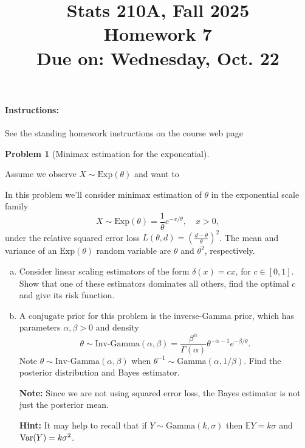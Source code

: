 \documentclass{article}
\newcommand{\EE}{\mathbb{E}}
\newcommand{\Var}{\textnormal{Var}}
\theoremstyle{definition}
\newtheorem{problem}{Problem}
\begin{document}
\title{Stats 210A, Fall 2025\\
  Homework 7 \\
  {\large {\bf Due on}: Wednesday, Oct. 22}}
\date{}

\maketitle

\paragraph{Instructions:} See the standing homework instructions on the course web page


\begin{problem}[Minimax estimation for the exponential]
\label{prob:minimax-exp}



Assume we observe $X\sim \text{Exp}(\theta)$ and want to 

In this problem we'll consider minimax estimation of $\theta$ in the exponential scale family
\[
X \sim \text{Exp}(\theta) = \frac{1}{\theta}e^{-x/\theta}, \quad x>0,
\]
under the relative squared error loss $L(\theta, d) = \left(\frac{d-\theta}{\theta}\right)^2$. The mean and variance of an $\text{Exp}(\theta)$ random variable are $\theta$ and $\theta^2$, respectively.

\begin{enumerate}[(a)]

\item Consider linear scaling estimators of the form $\delta(x) = cx$, for $c\in[0,1]$. Show that one of these estimators dominates all others, find the optimal $c$ and give its risk function.




\item A conjugate prior for this problem is the inverse-Gamma prior, which has parameters $\alpha,\beta>0$ and density
\[
\theta \sim \text{Inv-Gamma}(\alpha,\beta) = \frac{\beta^\alpha}{\Gamma(\alpha)} \theta^{-\alpha-1}e^{-\beta/\theta}.
\]
Note $\theta\sim \text{Inv-Gamma}(\alpha,\beta)$ when $\theta^{-1}\sim \text{Gamma}(\alpha,1/\beta)$. Find the posterior distribution and Bayes estimator.

{\bf Note:} Since we are not using squared error loss, the Bayes estimator is not just the posterior mean.

{\bf Hint:} It may help to recall that if $Y \sim\text{Gamma}(k,\sigma)$ then $\EE Y = k\sigma$ and $\Var(Y)=k\sigma^2$.




\end{enumerate}
\end{problem}
\end{document}
